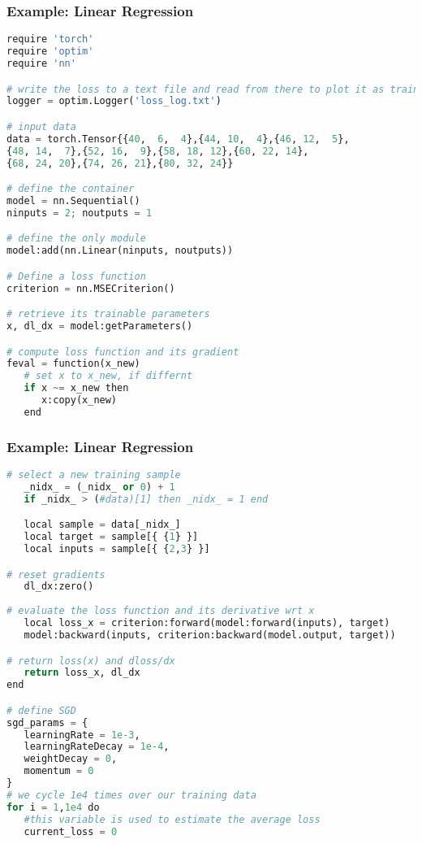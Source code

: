 \begin{frame}[fragile]
\MyLogo
\frametitle{Example: Linear Regression}  
\scriptsize{
\begin{lstlisting}[language=python]
require 'torch'
require 'optim'
require 'nn'

# write the loss to a text file and read from there to plot it as training proceeds
logger = optim.Logger('loss_log.txt')

# input data 
data = torch.Tensor{{40,  6,  4},{44, 10,  4},{46, 12,  5},
{48, 14,  7},{52, 16,  9},{58, 18, 12},{60, 22, 14},
{68, 24, 20},{74, 26, 21},{80, 32, 24}}

# define the container
model = nn.Sequential()                 
ninputs = 2; noutputs = 1

# define the only module
model:add(nn.Linear(ninputs, noutputs)) 

# Define a loss function
criterion = nn.MSECriterion()

# retrieve its trainable parameters
x, dl_dx = model:getParameters()

# compute loss function and its gradient 
feval = function(x_new)
   # set x to x_new, if differnt
   if x ~= x_new then
      x:copy(x_new)
   end
\end{lstlisting}
}
\end{frame}

\begin{frame}[fragile]
\MyLogo
\frametitle{Example: Linear Regression}  
\ContinueLineNumber
\scriptsize{
\begin{lstlisting}[language=python]
# select a new training sample
   _nidx_ = (_nidx_ or 0) + 1
   if _nidx_ > (#data)[1] then _nidx_ = 1 end

   local sample = data[_nidx_]
   local target = sample[{ {1} }]    
   local inputs = sample[{ {2,3} }] 

# reset gradients
   dl_dx:zero()
 
# evaluate the loss function and its derivative wrt x
   local loss_x = criterion:forward(model:forward(inputs), target)
   model:backward(inputs, criterion:backward(model.output, target))

# return loss(x) and dloss/dx
   return loss_x, dl_dx
end

# define SGD 
sgd_params = {
   learningRate = 1e-3,
   learningRateDecay = 1e-4,
   weightDecay = 0,
   momentum = 0
}
# we cycle 1e4 times over our training data
for i = 1,1e4 do
   #this variable is used to estimate the average loss
   current_loss = 0
\end{lstlisting}
}
\end{frame}

